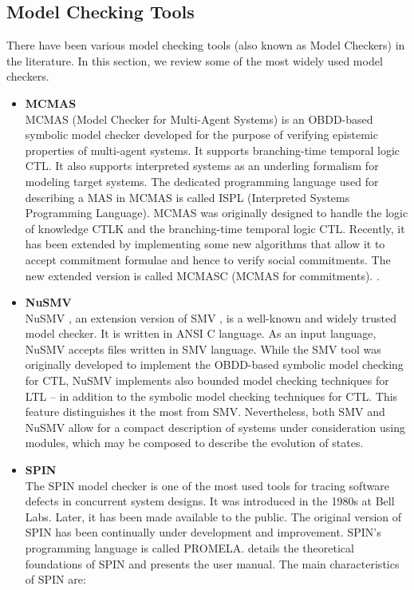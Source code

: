 \subsection{Model Checking Tools}
There have been various model checking tools (also known as Model Checkers) in the literature. In this section, we review some of the most widely used model checkers.
\begin{itemize}

\item \textbf{MCMAS}\\
    MCMAS (Model Checker for Multi-Agent Systems) \cite{Lomuscio2006} is an OBDD-based symbolic model checker developed for the purpose of verifying epistemic properties of multi-agent systems. It supports branching-time temporal logic CTL. It also supports interpreted systems as an underling formalism for modeling target systems. The dedicated programming language used for describing a MAS in MCMAS is called ISPL (Interpreted Systems Programming Language). MCMAS was originally designed to handle the logic of knowledge CTLK and the branching-time temporal logic CTL. Recently, it has been extended by implementing some new algorithms that allow it to accept commitment formulae and hence to verify social commitments. The new extended version is called MCMASC (MCMAS for commitments). \cite{El-Menshawy2012}.


\item \textbf{NuSMV}\\
    NuSMV \cite{Cimatti2002}, an extension version of SMV \cite{McMillan1992}, is a well-known and widely trusted model checker. It is written in ANSI C language. As an input language, NuSMV accepts files written in SMV language. While the SMV tool was originally developed to implement the OBDD-based symbolic model checking for CTL, NuSMV implements also bounded model checking techniques for LTL -- in addition to the symbolic model checking techniques for CTL. This feature distinguishes it the most from SMV. Nevertheless, both SMV and NuSMV allow for a compact description of systems under consideration using modules, which may be composed to describe the evolution of states.



\item \textbf{SPIN}\\
    The SPIN \cite{Holzmann1997} model checker is one of the most used tools for tracing software defects in concurrent system designs. It was introduced in the 1980s at Bell Labs. Later, it has been made available to the public. The original version of SPIN has been continually under development and improvement. SPIN's programming language is called PROMELA. \cite{Holzmann2003} details the theoretical foundations of SPIN and presents the user manual. The main characteristics of SPIN are:


\end{itemize}
